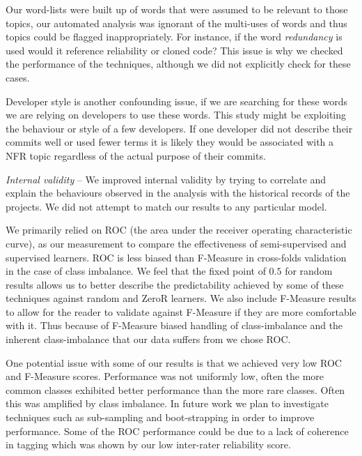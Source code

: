 \documentclass[smallextended]{svjour3}       %
\begin{document}
Our word-lists were built up of words that were assumed to be relevant
to those topics, our automated analysis was ignorant of the multi-uses
of words and thus topics could be flagged inappropriately. For
instance, if the word \emph{redundancy} is used would it reference
reliability or cloned code? This issue is why we checked the
performance of the techniques, although we did not explicitly check
for these cases.

Developer style is another confounding issue, if we are searching for
these words we are relying on developers to use these words. This
study might be exploiting the behaviour or style of a few
developers. If one developer did not describe their commits well or
used fewer terms it is likely they would be associated with a NFR
topic regardless of the actual purpose of their commits.

\emph{Internal validity} -- %
We improved internal validity by trying to correlate and explain the behaviours observed in the analysis with the historical records of the projects.
We did not attempt to match our results to any particular model.

We primarily relied on ROC (the area under the receiver operating
characteristic curve), as our measurement to compare the effectiveness
of semi-supervised and supervised learners. ROC is less biased than
F-Measure in cross-folds
validation~\cite{flach-icml03,Forman:2010:ACS:1882471.1882479} in the
case of class imbalance. We
feel that the fixed point of $0.5$ for random results allows us to
better describe the predictability achieved by some of these
techniques against random and ZeroR learners. 
We also include
F-Measure results to allow for the reader to validate against
F-Measure if they are more comfortable with it. Thus because of
F-Measure biased handling of class-imbalance and the inherent
class-imbalance that our data suffers from we chose ROC.

One potential issue with some of our results is that we achieved very
low ROC and F-Measure scores.  Performance was not uniformly low,
often the more common classes exhibited better performance than the
more rare classes.  Often this was amplified by class imbalance. In
future work we plan to investigate techniques such as sub-sampling and
boot-strapping in order to improve performance. Some of the ROC
performance could be due to a lack of coherence in tagging which was
shown by our low inter-rater reliability score.
\end{document}
